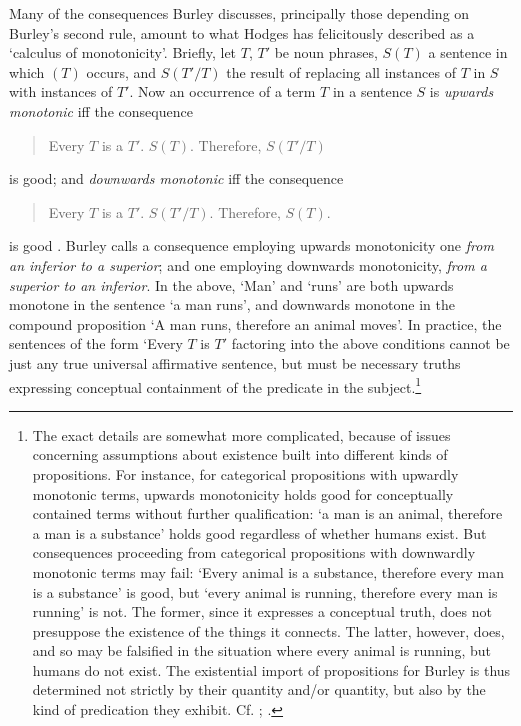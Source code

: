 \documentclass[]{birkjour}
\begin{document}
Many of the consequences Burley discusses, principally those depending on Burley's second rule, amount to what Hodges has felicitously described as a `calculus of monotonicity'. Briefly, let $T$, $T'$ be noun phrases, $S(T)$ a sentence in which $(T)$ occurs, and $S(T'/T)$ the result of replacing all instances of $T$ in $S$ with instances of $T'$. Now an occurrence of a term $T$ in a sentence $S$ is \textit{upwards monotonic} iff the consequence
\begin{quote}
	Every $T$ is a $T'$. $S(T)$. Therefore, $S(T'/T)$
\end{quote}
is good; and \textit{downwards monotonic} iff the consequence 
\begin{quote}
	Every $T$ is a $T'$. $S(T'/T)$. Therefore, $S(T)$.
\end{quote}
is good \autocite[pp. 93-94]{HodgesBurley}. Burley calls a consequence employing upwards monotonicity one \textit{from an inferior to a superior}; and one employing downwards monotonicity, \textit{from a superior to an inferior}. In the above, `Man' and `runs' are both upwards monotone in the sentence `a man runs', and downwards monotone in the compound proposition `A man runs, therefore an animal moves'. In practice, the sentences of the form `Every $T$ is $T'$ factoring into the above conditions cannot be just any true universal affirmative sentence, but must be necessary truths expressing conceptual containment of the predicate in the subject.\footnote{The exact details are somewhat more complicated, because of issues concerning assumptions about existence built into different kinds of propositions. For instance, for categorical propositions with upwardly monotonic terms, upwards monotonicity holds good for conceptually contained terms without further qualification: `a man is an animal, therefore a man is a substance' holds good regardless of whether humans exist. But consequences proceeding from categorical propositions with downwardly monotonic terms may fail: `Every animal is a substance, therefore every man is a substance' is good, but `every animal is running, therefore every man is running' is not. The former, since it expresses a conceptual truth, does not presuppose the existence of the things it connects. The latter, however, does, and so may be falsified in the situation where every animal is running, but humans do not exist. The existential import of propositions for Burley is thus determined not strictly by their quantity and/or quantity, but also by the kind of predication they exhibit. Cf. \autocite[pp. 61.4-5; 85.3-5, 25-26; 216.15-18]{BurleyDPAL}; \autocite[p. 97]{HodgesBurley}.} 
\end{document}

